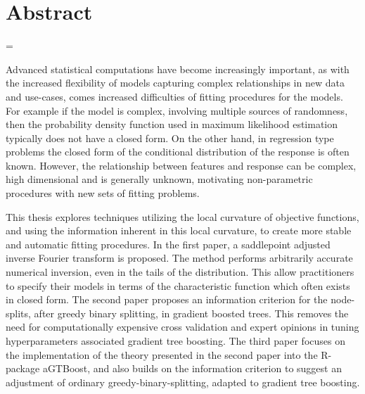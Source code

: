 \chapter*{Abstract}

\emergencystretch=\maxdimen
{}

Advanced statistical computations have become increasingly important, as with the increased flexibility of models capturing complex relationships in new data and use-cases,
comes increased difficulties of fitting procedures for the models.
For example if the model is complex, involving multiple sources of randomness, then the probability density function used in maximum likelihood estimation typically does not have a closed form.
On the other hand, in regression type problems the closed form of the conditional distribution of the response is often known. However, the relationship between features and response can be complex, high dimensional and is generally unknown, motivating non-parametric procedures with new sets of fitting problems.


This thesis explores techniques utilizing the local curvature of objective functions, and using the information inherent in this local curvature, to create more stable and automatic fitting procedures.
In the first paper, a saddlepoint adjusted inverse Fourier transform is proposed.
The method performs arbitrarily accurate numerical inversion, even in the tails of the distribution.
This allow practitioners to specify their models in terms of the characteristic function which often exists in closed form.
The second paper proposes an information criterion for the node-splits, after greedy binary splitting, in gradient boosted trees.
This removes the need for computationally expensive cross validation and expert opinions in tuning hyperparameters associated gradient tree boosting.
The third paper focuses on the implementation of the theory presented in the second paper into the R-package aGTBoost, and also builds on the information criterion to suggest an adjustment of ordinary greedy-binary-splitting, adapted to gradient tree boosting.

